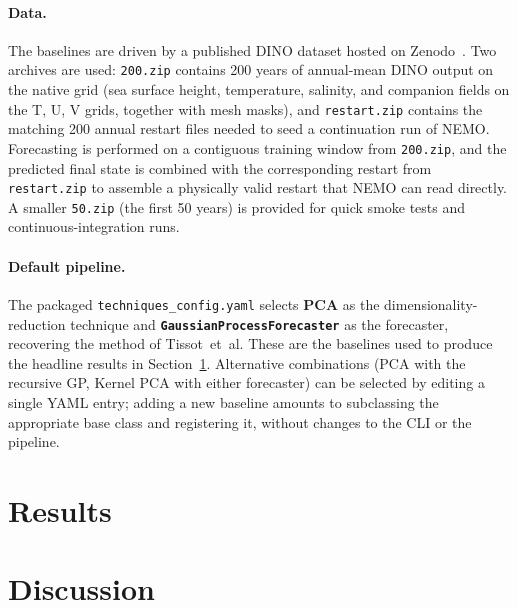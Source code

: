 \documentclass{article}
\begin{document}
\paragraph{Data.}
The baselines are driven by a published DINO dataset hosted on
Zenodo~\citep{archer_dino_dataset_2026}. Two archives are used:
\texttt{200.zip} contains 200 years of annual-mean DINO output on the
native grid (sea surface height, temperature, salinity, and companion
fields on the T, U, V grids, together with mesh masks), and
\texttt{restart.zip} contains the matching 200 annual restart files
needed to seed a continuation run of NEMO. Forecasting is performed on
a contiguous training window from \texttt{200.zip}, and the predicted
final state is combined with the corresponding restart from
\texttt{restart.zip} to assemble a physically valid restart that NEMO
can read directly. A smaller \texttt{50.zip} (the first 50 years) is
provided for quick smoke tests and continuous-integration runs.

\paragraph{Default pipeline.}
The packaged \texttt{techniques\_config.yaml} selects \textbf{PCA} as
the dimensionality-reduction technique and
\textbf{\texttt{GaussianProcessForecaster}} as the forecaster,
recovering the method of Tissot~et~al. These are the baselines used to
produce the headline results in Section~\ref{sec:results}. Alternative
combinations (PCA with the recursive GP, Kernel PCA with either
forecaster) can be selected by editing a single YAML entry; adding a
new baseline amounts to subclassing the appropriate base class and
registering it, without changes to the CLI or the pipeline.


\section{Results}
\label{sec:results}



\section{Discussion}
\label{sec:discussion}

\end{document}
